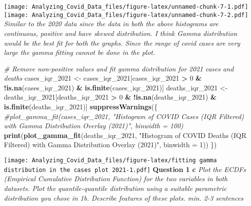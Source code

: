 \documentclass[
]{article}
\newenvironment{Shaded}{\begin{snugshade}}{\end{snugshade}}
\newcommand{\AttributeTok}[1]{\textcolor[rgb]{0.13,0.29,0.53}{#1}}
\newcommand{\CommentTok}[1]{\textcolor[rgb]{0.56,0.35,0.01}{\textit{#1}}}
\newcommand{\DecValTok}[1]{\textcolor[rgb]{0.00,0.00,0.81}{#1}}
\newcommand{\FunctionTok}[1]{\textcolor[rgb]{0.13,0.29,0.53}{\textbf{#1}}}
\newcommand{\NormalTok}[1]{#1}
\newcommand{\OtherTok}[1]{\textcolor[rgb]{0.56,0.35,0.01}{#1}}
\newcommand{\SpecialCharTok}[1]{\textcolor[rgb]{0.81,0.36,0.00}{\textbf{#1}}}
\newcommand{\StringTok}[1]{\textcolor[rgb]{0.31,0.60,0.02}{#1}}
\begin{document}
\texttt{[image: Analyzing\_Covid\_Data\_files/figure-latex/unnamed-chunk-7-1.pdf]}
\texttt{[image: Analyzing\_Covid\_Data\_files/figure-latex/unnamed-chunk-7-2.pdf]}
\emph{Similar to the 2020 data since the data in both the above
histograms are continuous, positive and have skewed distribution. I
think Gamma distribution would be the best fit for both the graphs.
Since the range of covid cases are very large the gamma fitting cannot
be done in the plot.}

\begin{Shaded}
\begin{Highlighting}[]
\CommentTok{\# Remove non{-}positive values and fit gamma distribution for 2021 cases and deaths}
\NormalTok{cases\_iqr\_2021 }\OtherTok{\textless{}{-}}\NormalTok{ cases\_iqr\_2021[cases\_iqr\_2021 }\SpecialCharTok{\textgreater{}} \DecValTok{0} \SpecialCharTok{\&} \SpecialCharTok{!}\FunctionTok{is.na}\NormalTok{(cases\_iqr\_2021) }\SpecialCharTok{\&} \FunctionTok{is.finite}\NormalTok{(cases\_iqr\_2021)]}
\NormalTok{deaths\_iqr\_2021 }\OtherTok{\textless{}{-}}\NormalTok{ deaths\_iqr\_2021[deaths\_iqr\_2021 }\SpecialCharTok{\textgreater{}} \DecValTok{0} \SpecialCharTok{\&} \SpecialCharTok{!}\FunctionTok{is.na}\NormalTok{(deaths\_iqr\_2021) }\SpecialCharTok{\&} \FunctionTok{is.finite}\NormalTok{(deaths\_iqr\_2021)]}
\FunctionTok{suppressWarnings}\NormalTok{(\{}
\CommentTok{\#plot\_gamma\_fit(cases\_iqr\_2021, "Histogram of COVID Cases (IQR Filtered) with Gamma Distribution Overlay (2021)", binwidth = 100)}
\FunctionTok{print}\NormalTok{(}\FunctionTok{plot\_gamma\_fit}\NormalTok{(deaths\_iqr\_2021, }\StringTok{"Histogram of COVID Deaths (IQR Filtered) with Gamma Distribution Overlay (2021)"}\NormalTok{, }\AttributeTok{binwidth =} \DecValTok{1}\NormalTok{))}
\NormalTok{\})}
\end{Highlighting}
\end{Shaded}

\texttt{[image: Analyzing\_Covid\_Data\_files/figure-latex/fitting gamma distribution in the cases plot 2021-1.pdf]}
\textbf{Question 1 c } \emph{Plot the ECDFs (Empirical Cumulative
Distribution Function) for the two variables in both datasets. Plot the
quantile-quantile distribution using a suitable parametric distribution
you chose in 1b. Describe features of these plots. min. 2-3 sentences}

\begin{Shaded}
\end{Shaded}
\end{document}
